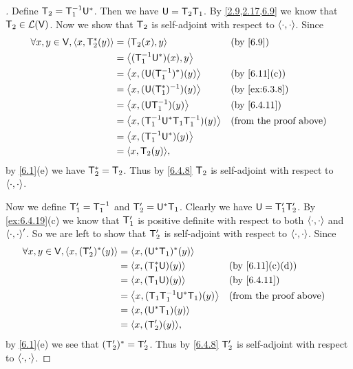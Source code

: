 \begin{proof}[]
  Define \(\mathsf{T}_2 = \mathsf{T}_1^{-1} \mathsf{U}^*\).
  Then we have \(\mathsf{U} = \mathsf{T}_2 \mathsf{T}_1\).
  By \cref{2.9,2.17,6.9} we know that \(\mathsf{T}_2 \in \mathcal{L}(\mathsf{V})\).
  Now we show that \(\mathsf{T}_2\) is self-adjoint with respect to \(\left\langle\cdot, \cdot\right\rangle\).
  Since
  \begin{align*}
    \forall x, y \in \V, \inn{x, \T_2^*(y)} & = \inn{\T_2(x), y}                            &  & \text{(by \cref{6.9})}        \\
                                            & = \inn{(\T_1^{-1} \U^*)(x), y}                                                   \\
                                            & = \inn{x, (\U (\T_1^{-1})^*)(y)}              &  & \text{(by \cref{6.11}(c))}    \\
                                            & = \inn{x, (\U (\T_1^*)^{-1})(y)}              &  & \text{(by \cref{ex:6.3.8})}   \\
                                            & = \inn{x, (\U \T_1^{-1})(y)}                  &  & \text{(by \cref{6.4.11})}     \\
                                            & = \inn{x, (\T_1^{-1} \U^* \T_1 \T_1^{-1})(y)} &  & \text{(from the proof above)} \\
                                            & = \inn{x, (\T_1^{-1} \U^*)(y)}                                                   \\
                                            & = \inn{x, \T_2(y)},
  \end{align*}
  by \cref{6.1}(e) we have \(\mathsf{T}_2^* = \mathsf{T}_2\).
  Thus by \cref{6.4.8} \(\mathsf{T}_2\) is self-adjoint with respect to \(\left\langle\cdot, \cdot\right\rangle\).

  Now we define \(\mathsf{T}_1' = \mathsf{T}_1^{-1}\) and \(\mathsf{T}_2' = \mathsf{U}^* \mathsf{T}_1\).
  Clearly we have \(\mathsf{U} = \mathsf{T}_1' \mathsf{T}_2'\).
  By \cref{ex:6.4.19}(c) we know that \(\mathsf{T}_1'\) is positive definite with respect to both \(\left\langle\cdot, \cdot\right\rangle\) and \(\left\langle\cdot, \cdot\right\rangle'\).
  So we are left to show that \(\mathsf{T}_2'\) is self-adjoint with respect to \(\left\langle\cdot, \cdot\right\rangle\).
  Since
  \begin{align*}
    \forall x, y \in \V, \inn{x, (\T_2')^*(y)} & = \inn{x, (\U^* \T_1)^*(y)}                                                 \\
                                               & = \inn{x, (\T_1^* \U)(y)}                &  & \text{(by \cref{6.11}(c)(d))} \\
                                               & = \inn{x, (\T_1 \U)(y)}                  &  & \text{(by \cref{6.4.11})}     \\
                                               & = \inn{x, (\T_1 \T_1^{-1} \U^* \T_1)(y)} &  & \text{(from the proof above)} \\
                                               & = \inn{x, (\U^* \T_1)(y)}                                                   \\
                                               & = \inn{x, (\T_2')(y)},
  \end{align*}
  by \cref{6.1}(e) we see that \((\mathsf{T}_2')^* = \mathsf{T}_2'\).
  Thus by \cref{6.4.8} \(\mathsf{T}_2'\) is self-adjoint with respect to \(\left\langle\cdot, \cdot\right\rangle\).
\end{proof}
